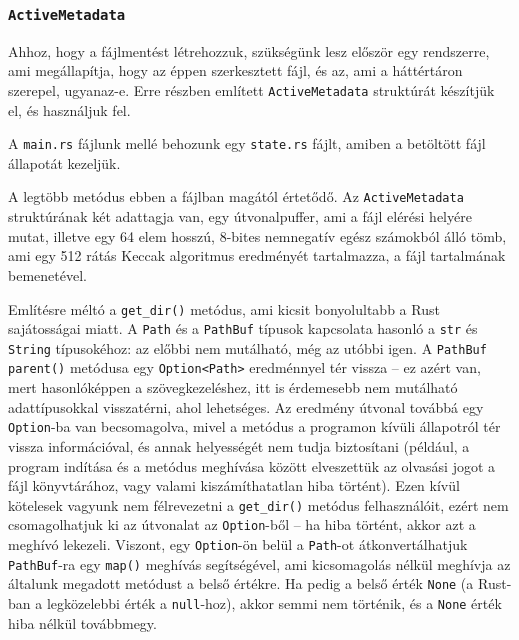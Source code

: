 
\subsubsection{\texttt{ActiveMetadata}}

Ahhoz, hogy a fájlmentést létrehozzuk, szükségünk lesz először egy rendszerre, ami megállapítja,
hogy az éppen szerkesztett fájl, és az, ami a háttértáron szerepel, ugyanaz-e.
Erre  részben említett \texttt{ActiveMetadata} struktúrát készítjük el,
és használjuk fel.

A \texttt{main.rs} fájlunk mellé behozunk egy \texttt{state.rs} fájlt, amiben a betöltött
fájl állapotát kezeljük.



A legtöbb metódus ebben a fájlban magától értetődő.
Az \texttt{ActiveMetadata} struktúrának két adattagja van, egy útvonalpuffer,
ami a fájl elérési helyére mutat, illetve egy 64 elem hosszú, 8-bites nemnegatív egész számokból álló tömb,
ami egy 512 rátás Keccak algoritmus eredményét tartalmazza, a fájl tartalmának bemenetével.

Említésre méltó a \verb+get_dir()+ metódus, ami kicsit bonyolultabb a Rust sajátosságai miatt.
A \texttt{Path} és a \texttt{PathBuf} típusok kapcsolata hasonló a \texttt{str} és \texttt{String}
típusokéhoz: az előbbi nem mutálható, még az utóbbi igen.
A \texttt{PathBuf} \texttt{parent()} metódusa egy \texttt{Option<Path>} eredménnyel tér vissza --
ez azért van, mert hasonlóképpen a szövegkezeléshez, itt is érdemesebb nem mutálható adattípusokkal
visszatérni, ahol lehetséges.
Az eredmény útvonal továbbá egy \texttt{Option}-ba van becsomagolva, mivel a metódus a programon
kívüli állapotról tér vissza információval, és annak helyességét nem tudja biztosítani
(például, a program indítása és a metódus meghívása között elveszettük az olvasási jogot a fájl
könyvtárához, vagy valami kiszámíthatatlan hiba történt).
Ezen kívül kötelesek vagyunk nem félrevezetni a \verb+get_dir()+ metódus felhasználóit,
ezért nem csomagolhatjuk ki az útvonalat az \texttt{Option}-ből --
ha hiba történt, akkor azt a meghívó lekezeli.
Viszont, egy \texttt{Option}-ön belül a \texttt{Path}-ot átkonvertálhatjuk \texttt{PathBuf}-ra 
egy \texttt{map()} meghívás segítségével, ami kicsomagolás nélkül meghívja az általunk megadott
metódust a belső értékre.
Ha pedig a belső érték \texttt{None} (a Rust-ban a legközelebbi érték a \texttt{null}-hoz),
akkor semmi nem történik, és a \texttt{None} érték hiba nélkül továbbmegy.

